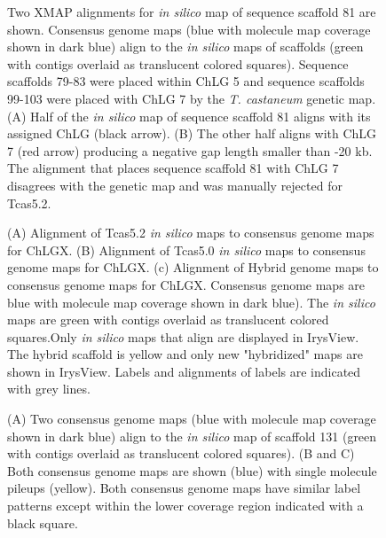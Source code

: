 \documentclass{bmcart}
\begin{document}
\begin{backmatter}
\begin{figure}[h!]
      \end{figure}                      
\begin{figure}[h!]
	\caption{
 Two XMAP alignments for \textit{in silico} map of sequence scaffold 81 are shown. Consensus genome maps (blue with molecule map coverage shown in dark blue) align to the \textit{in silico} maps of scaffolds (green with contigs overlaid as translucent colored squares). Sequence scaffolds 79-83 were placed within ChLG 5 and sequence scaffolds 99-103 were placed with ChLG 7 by the \textit{T. castaneum} genetic map. (A) Half of the \textit{in silico} map of sequence scaffold 81 aligns with its assigned ChLG (black arrow). (B) The other half aligns with ChLG 7 (red arrow) producing a negative gap length smaller than -20 kb. The alignment that places sequence scaffold 81 with ChLG 7 disagrees with the genetic map and was manually rejected for Tcas5.2.}
      \end{figure} 

\begin{figure}[h!]
	\caption{
 (A) Alignment of Tcas5.2 \textit{in silico} maps to consensus genome maps for ChLGX. (B) Alignment of Tcas5.0 \textit{in silico} maps to consensus genome maps for ChLGX. (c) Alignment of Hybrid genome maps to consensus genome maps for ChLGX. Consensus genome maps are blue with molecule map coverage shown in dark blue). The \textit{in silico} maps are green with contigs overlaid as translucent colored squares.Only \textit{in silico} maps that align are displayed in IrysView. The hybrid scaffold is yellow and only new "hybridized" maps are shown in IrysView. Labels and alignments of labels are indicated with grey lines. }
      \end{figure}  
\begin{figure}[h!]
	\caption{
 (A) Two consensus genome maps (blue with molecule map coverage shown in dark blue) align to the \textit{in silico} map of scaffold 131 (green with contigs overlaid as translucent colored squares). (B and C) Both consensus genome maps are shown (blue) with single molecule pileups (yellow). Both consensus genome maps have similar label patterns except within the lower coverage region indicated with a black square.}
\end{figure}            



\end{backmatter}
\end{document}
